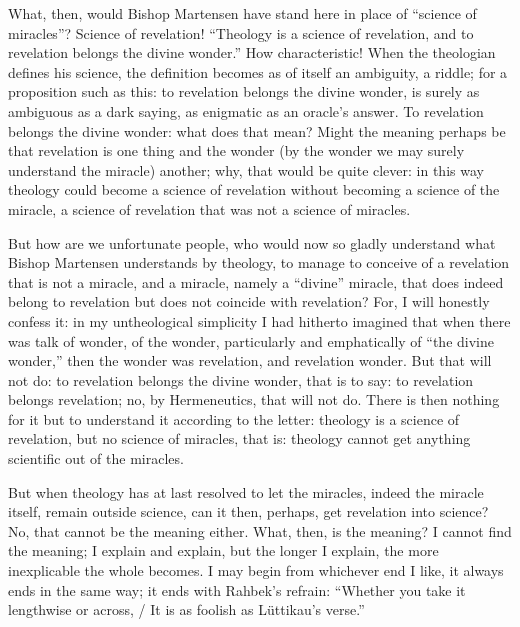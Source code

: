 \documentclass[12pt]{book}
\newcommand{\opage}[1]{\marginnote{\footnotesize\textit{[#1]}}}
\begin{document}
What, then, would Bishop Martensen have stand here in place of ``science of miracles''? Science of revelation! ``Theology is a science of revelation, and to revelation belongs the divine wonder.'' How characteristic! When the theologian defines his science, the definition becomes as of itself an ambiguity, a riddle; for a proposition such as this: to revelation belongs the divine wonder, is surely as ambiguous as a dark saying, as enigmatic as an oracle's answer. To revelation belongs the divine wonder: what does that mean? Might the meaning perhaps be that revelation is one thing and the wonder (by the wonder we may surely understand the miracle) another; why, that would be quite clever: in this way theology could become a science of revelation without becoming a science of the miracle, a science of revelation that was not a science of miracles.

But how are we unfortunate people, who would now so gladly understand what Bishop Martensen understands by theology, to manage to conceive of a revelation that is not a miracle, and a miracle, namely a ``divine''
\opage{83}\setcounter{footnote}{0}%
miracle, that does indeed belong to revelation but does not coincide with revelation? For, I will honestly confess it: in my untheological simplicity I had hitherto imagined that when there was talk of wonder, of the wonder, particularly and emphatically of ``the divine wonder,'' then the wonder was revelation, and revelation wonder. But that will not do: to revelation belongs the divine wonder, that is to say: to revelation belongs revelation; no, by Hermeneutics, that will not do. There is then nothing for it but to understand it according to the letter: theology is a science of revelation, but no science of miracles, that is: theology cannot get anything scientific out of the miracles.

But when theology has at last resolved to let the miracles, indeed the miracle itself, remain outside science, can it then, perhaps, get revelation into science? No, that cannot be the meaning either. What, then, is the meaning? I cannot find the meaning; I explain and explain, but the longer I explain, the more inexplicable the whole becomes. I may begin from whichever end I like, it always ends in the same way; it ends with Rahbek's refrain: ``Whether you take it lengthwise or across, / It is as foolish as Lüttikau's verse.''
\end{document}
